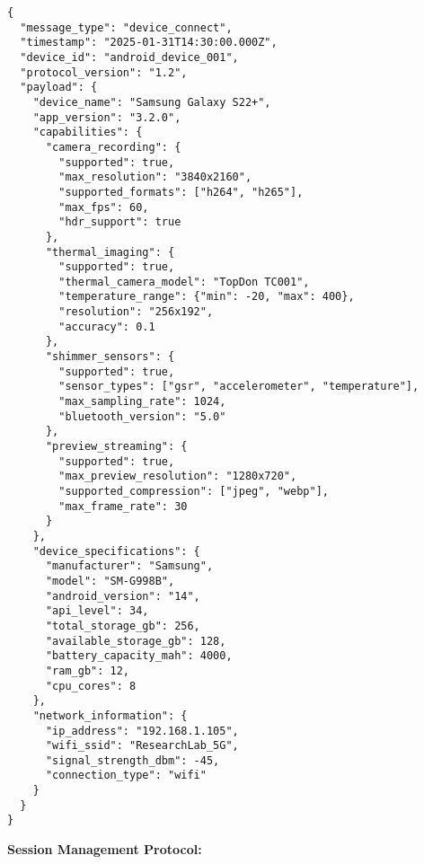 \documentclass[12pt,a4paper]{article}
\begin{document}
\begin{verbatim}
{
  "message_type": "device_connect",
  "timestamp": "2025-01-31T14:30:00.000Z",
  "device_id": "android_device_001",
  "protocol_version": "1.2",
  "payload": {
    "device_name": "Samsung Galaxy S22+",
    "app_version": "3.2.0",
    "capabilities": {
      "camera_recording": {
        "supported": true,
        "max_resolution": "3840x2160",
        "supported_formats": ["h264", "h265"],
        "max_fps": 60,
        "hdr_support": true
      },
      "thermal_imaging": {
        "supported": true,
        "thermal_camera_model": "TopDon TC001",
        "temperature_range": {"min": -20, "max": 400},
        "resolution": "256x192",
        "accuracy": 0.1
      },
      "shimmer_sensors": {
        "supported": true,
        "sensor_types": ["gsr", "accelerometer", "temperature"],
        "max_sampling_rate": 1024,
        "bluetooth_version": "5.0"
      },
      "preview_streaming": {
        "supported": true,
        "max_preview_resolution": "1280x720",
        "supported_compression": ["jpeg", "webp"],
        "max_frame_rate": 30
      }
    },
    "device_specifications": {
      "manufacturer": "Samsung",
      "model": "SM-G998B",
      "android_version": "14",
      "api_level": 34,
      "total_storage_gb": 256,
      "available_storage_gb": 128,
      "battery_capacity_mah": 4000,
      "ram_gb": 12,
      "cpu_cores": 8
    },
    "network_information": {
      "ip_address": "192.168.1.105",
      "wifi_ssid": "ResearchLab_5G",
      "signal_strength_dbm": -45,
      "connection_type": "wifi"
    }
  }
}
\end{verbatim}

\textbf{Session Management Protocol:}
\end{document}
